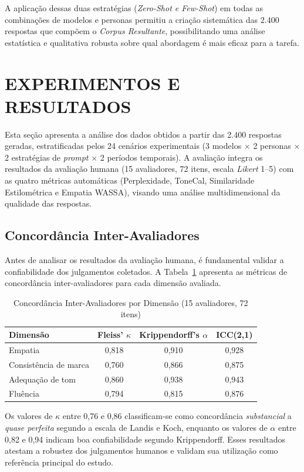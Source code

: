 \documentclass[12pt, a4paper]{article}
\numberwithin{equation}{section}
\begin{document}
A aplicação dessas duas estratégias (\textit{Zero-Shot e Few-Shot}) em todas as combinações de modelos e personas permitiu a criação sistemática das 2.400 respostas que compõem o \textit{Corpus Resultante}, possibilitando uma análise estatística e qualitativa robusta sobre qual abordagem é mais eficaz para a tarefa.

\newpage
\section{EXPERIMENTOS E RESULTADOS}

Esta seção apresenta a análise dos dados obtidos a partir das 2.400 respostas geradas, estratificadas pelos 24 cenários experimentais (3 modelos $\times$ 2 personas $\times$ 2 estratégias de \textit{prompt} $\times$ 2 períodos temporais). A avaliação integra os resultados da avaliação humana (15 avaliadores, 72 itens, escala \textit{Likert} 1--5) com as quatro métricas automáticas (Perplexidade, ToneCal, Similaridade Estilométrica e Empatia WASSA), visando uma análise multidimensional da qualidade das respostas.

\subsection{Concordância Inter-Avaliadores}

Antes de analisar os resultados da avaliação humana, é fundamental validar a confiabilidade dos julgamentos coletados. A Tabela~\ref{tab:concordancia} apresenta as métricas de concordância inter-avaliadores para cada dimensão avaliada.

\begin{table}[H]
\centering
\caption{Concordância Inter-Avaliadores por Dimensão (15 avaliadores, 72 itens)}
\label{tab:concordancia}
\begin{tabular}{@{}lccc@{}}
\toprule
\textbf{Dimensão} & \textbf{Fleiss' $\kappa$} & \textbf{Krippendorff's $\alpha$} & \textbf{ICC(2,1)} \\ \midrule
Empatia & 0,818 & 0,910 & 0,928 \\
Consistência de marca & 0,760 & 0,866 & 0,875 \\
Adequação de tom & 0,860 & 0,938 & 0,943 \\
Fluência & 0,794 & 0,815 & 0,876 \\ \bottomrule
\end{tabular}
\end{table}

Os valores de $\kappa$ entre 0,76 e 0,86 classificam-se como concordância \textit{substancial} a \textit{quase perfeita} segundo a escala de Landis e Koch, enquanto os valores de $\alpha$ entre 0,82 e 0,94 indicam boa confiabilidade segundo Krippendorff. Esses resultados atestam a robustez dos julgamentos humanos e validam sua utilização como referência principal do estudo.
\end{document}
